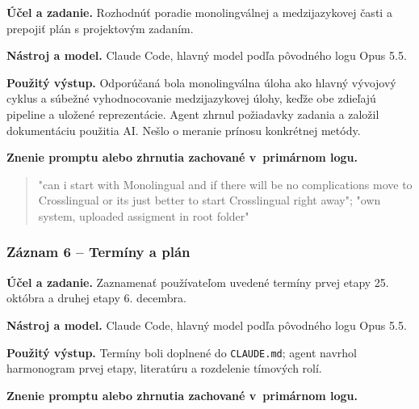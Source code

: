 \par\noindent \textbf{Účel a zadanie.} Rozhodnúť poradie monolingválnej a medzijazykovej časti a prepojiť plán s projektovým zadaním.\par\smallskip
\par\noindent \textbf{Nástroj a model.} Claude Code, hlavný model podľa pôvodného logu Opus 5.5.\par\smallskip
\par\noindent \textbf{Použitý výstup.} Odporúčaná bola monolingválna úloha ako hlavný vývojový cyklus a súbežné vyhodnocovanie medzijazykovej úlohy, keďže obe zdieľajú pipeline a uložené reprezentácie. Agent zhrnul požiadavky zadania a založil dokumentáciu použitia AI. Nešlo o meranie prínosu konkrétnej metódy.\par\smallskip

\par\noindent\textbf{Znenie promptu alebo zhrnutia zachované v~primárnom logu.}

\begin{quote}\normalsize "can i start with Monolingual and if there will be no complications move to Crosslingual or its just better to start Crosslingual right away"; "own system, uploaded assigment in root folder"\end{quote}

\subsubsection*{Záznam 6 -- Termíny a plán}


\par\noindent \textbf{Účel a zadanie.} Zaznamenať používateľom uvedené termíny prvej etapy 25. októbra a druhej etapy 6. decembra.\par\smallskip
\par\noindent \textbf{Nástroj a model.} Claude Code, hlavný model podľa pôvodného logu Opus 5.5.\par\smallskip
\par\noindent \textbf{Použitý výstup.} Termíny boli doplnené do \texttt{CLAUDE.\allowbreak{}md}; agent navrhol harmonogram prvej etapy, literatúru a rozdelenie tímových rolí.\par\smallskip

\par\noindent\textbf{Znenie promptu alebo zhrnutia zachované v~primárnom logu.}

